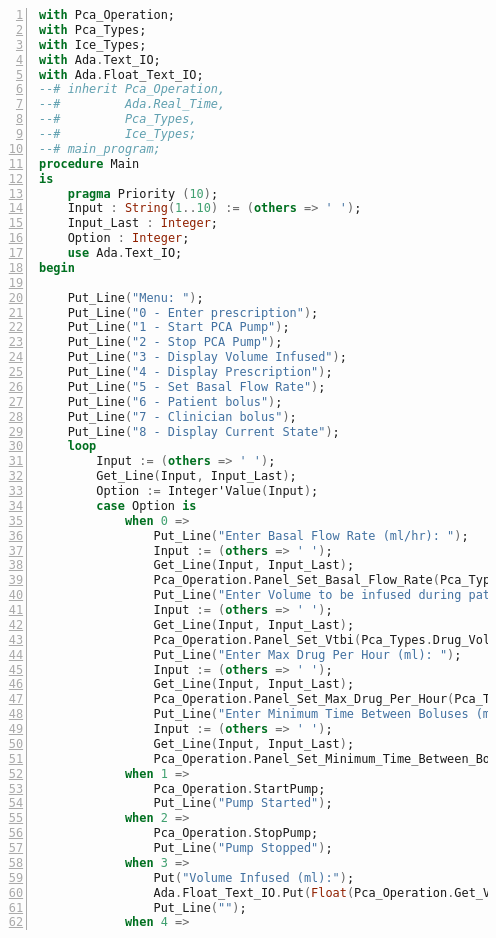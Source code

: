 \singlespacing
\begin{lstlisting}[language=ada, gobble=0, numbers=left, caption={\lstinline{Main} procedure}, label={listing:pca_ravenscar:main}]
with Pca_Operation;
with Pca_Types;
with Ice_Types;
with Ada.Text_IO;
with Ada.Float_Text_IO;
--# inherit Pca_Operation,
--#         Ada.Real_Time,
--#         Pca_Types,
--#         Ice_Types;
--# main_program;
procedure Main
is
    pragma Priority (10);
    Input : String(1..10) := (others => ' ');
    Input_Last : Integer;
    Option : Integer;
    use Ada.Text_IO;
begin

    Put_Line("Menu: ");
    Put_Line("0 - Enter prescription");
    Put_Line("1 - Start PCA Pump");
    Put_Line("2 - Stop PCA Pump");
    Put_Line("3 - Display Volume Infused");
    Put_Line("4 - Display Prescription");
    Put_Line("5 - Set Basal Flow Rate");
    Put_Line("6 - Patient bolus");
    Put_Line("7 - Clinician bolus");
    Put_Line("8 - Display Current State");
    loop
        Input := (others => ' ');
        Get_Line(Input, Input_Last);
        Option := Integer'Value(Input);
        case Option is
            when 0 =>
                Put_Line("Enter Basal Flow Rate (ml/hr): ");
                Input := (others => ' ');
                Get_Line(Input, Input_Last);
                Pca_Operation.Panel_Set_Basal_Flow_Rate(Pca_Types.Flow_Rate(Integer'Value(Input)));
                Put_Line("Enter Volume to be infused during patient bolus (ml): ");
                Input := (others => ' ');
                Get_Line(Input, Input_Last);
                Pca_Operation.Panel_Set_Vtbi(Pca_Types.Drug_Volume(Integer'Value(Input)));
                Put_Line("Enter Max Drug Per Hour (ml): ");
                Input := (others => ' ');
                Get_Line(Input, Input_Last);
                Pca_Operation.Panel_Set_Max_Drug_Per_Hour(Pca_Types.Drug_Volume(Integer'Value(Input)));
                Put_Line("Enter Minimum Time Between Boluses (min.): ");
                Input := (others => ' ');
                Get_Line(Input, Input_Last);
                Pca_Operation.Panel_Set_Minimum_Time_Between_Bolus(Ice_Types.Minute(Integer'Value(Input)));
            when 1 =>
                Pca_Operation.StartPump;
                Put_Line("Pump Started");
            when 2 =>
                Pca_Operation.StopPump;
                Put_Line("Pump Stopped");
            when 3 =>
                Put("Volume Infused (ml):");
                Ada.Float_Text_IO.Put(Float(Pca_Operation.Get_Volume_Infused) / Float(1000), AFT=>2, EXP=>0);
                Put_Line("");
            when 4 =>

\end{lstlisting}
